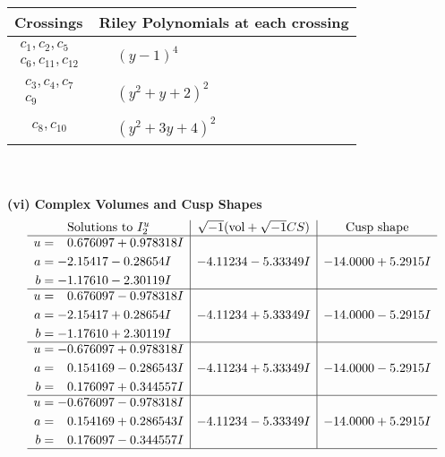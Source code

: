 \documentclass[1p]{elsarticle_modified}
\theoremstyle{definition}
\newcommand{\I}{\sqrt{-1}}
\begin{document}
\begin{tabular}{m{50pt}|m{274pt}}
Crossings & \hspace{64pt}Riley Polynomials at each crossing \\
\hline $$\begin{aligned}c_{1},c_{2},c_{5}\\c_{6},c_{11},c_{12}\end{aligned}$$&$\begin{aligned}
&(y-1)^4
\end{aligned}$\\
\hline $$\begin{aligned}c_{3},c_{4},c_{7}\\c_{9}\end{aligned}$$&$\begin{aligned}
&(y^2+y+2)^2
\end{aligned}$\\
\hline $$\begin{aligned}c_{8},c_{10}\end{aligned}$$&$\begin{aligned}
&(y^2+3 y+4)^2
\end{aligned}$\\
\hline
\end{tabular}\\~\\
\newpage\flushleft \textbf{(vi) Complex Volumes and Cusp Shapes}
$$\begin{array}{c|c|c}  
\text{Solutions to }I^u_{2}& \I (\text{vol} + \sqrt{-1}CS) & \text{Cusp shape}\\
 \hline 
\begin{aligned}
u &= \phantom{-}0.676097 + 0.978318 I \\
a &= -2.15417 - 0.28654 I \\
b &= -1.17610 - 2.30119 I\end{aligned}
 & -4.11234 - 5.33349 I & -14.0000 + 5.2915 I \\ \hline\begin{aligned}
u &= \phantom{-}0.676097 - 0.978318 I \\
a &= -2.15417 + 0.28654 I \\
b &= -1.17610 + 2.30119 I\end{aligned}
 & -4.11234 + 5.33349 I & -14.0000 - 5.2915 I \\ \hline\begin{aligned}
u &= -0.676097 + 0.978318 I \\
a &= \phantom{-}0.154169 - 0.286543 I \\
b &= \phantom{-}0.176097 + 0.344557 I\end{aligned}
 & -4.11234 + 5.33349 I & -14.0000 - 5.2915 I \\ \hline\begin{aligned}
u &= -0.676097 - 0.978318 I \\
a &= \phantom{-}0.154169 + 0.286543 I \\
b &= \phantom{-}0.176097 - 0.344557 I\end{aligned}
 & -4.11234 - 5.33349 I & -14.0000 + 5.2915 I\\
 \hline 
 \end{array}$$\newpage\newpage\renewcommand{\arraystretch}{1}
\end{document}
